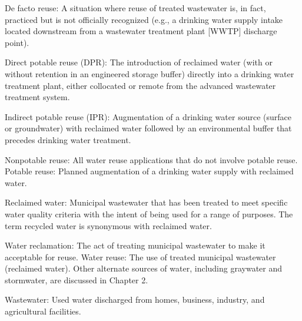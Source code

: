 De facto reuse: A situation where reuse of treated wastewater is, in fact, practiced but is not officially recognized (e.g., a drinking water supply intake located downstream from a wastewater treatment plant [WWTP] discharge point).

Direct potable reuse (DPR): The introduction of reclaimed water (with or without retention in an engineered storage buffer) directly into a drinking water treatment plant, either collocated or remote from the advanced wastewater treatment system.

Indirect potable reuse (IPR): Augmentation of a drinking water source (surface or groundwater) with reclaimed water followed by an environmental buffer that precedes drinking water treatment.

Nonpotable reuse: All water reuse applications that do not involve potable reuse.
Potable reuse: Planned augmentation of a drinking water supply with reclaimed water.

Reclaimed water: Municipal wastewater that has been treated to meet specific water quality criteria with the intent of being used for a range of purposes. The term recycled water is synonymous with reclaimed water.

Water reclamation: The act of treating municipal wastewater to make it acceptable for reuse.
Water reuse: The use of treated municipal wastewater (reclaimed water). Other alternate sources of water, including graywater and stormwater, are discussed in Chapter 2.

Wastewater: Used water discharged from homes, business, industry, and agricultural facilities.